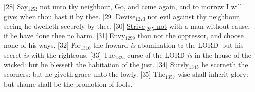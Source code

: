 [28] \textcolor[cmyk]{0.99998,1,0,0}{\underline{Say\textcolor{jungle}{$_{1252}$} not} unto thy neighbour, Go, and come again, and to morrow I will give; when thou hast it by thee.}
[29] \textcolor[cmyk]{0.99998,1,0,0}{\underline{Devise\textcolor{jungle}{$_{1273}$} not} evil against thy neighbour, seeing he dwelleth securely by thee.}
[30] \textcolor[cmyk]{0.99998,1,0,0}{\underline{Strive\textcolor{jungle}{$_{1285}$} not} with a man without cause, if he have done thee no harm.}
[31] \textcolor[cmyk]{0.99998,1,0,0}{\underline{Envy\textcolor{jungle}{$_{1299}$} thou not} the oppressor, and choose none of his ways.}
[32] \textcolor[cmyk]{0.99998,1,0,0}{For\textcolor{jungle}{$_{1310}$} the froward \emph{is} abomination to the LORD: but his secret \emph{is} with the righteous.}
[33] \textcolor[cmyk]{0.99998,1,0,0}{The\textcolor{jungle}{$_{1325}$} curse of the LORD \emph{is} in the house of the wicked: but he blesseth the habitation of the just.}
[34] \textcolor[cmyk]{0.99998,1,0,0}{Surely\textcolor{jungle}{$_{1345}$} he scorneth the scorners: but he giveth grace unto the lowly.}
[35] \textcolor[cmyk]{0.99998,1,0,0}{The\textcolor{jungle}{$_{1357}$} wise shall inherit glory: but shame shall be the promotion of fools.}


